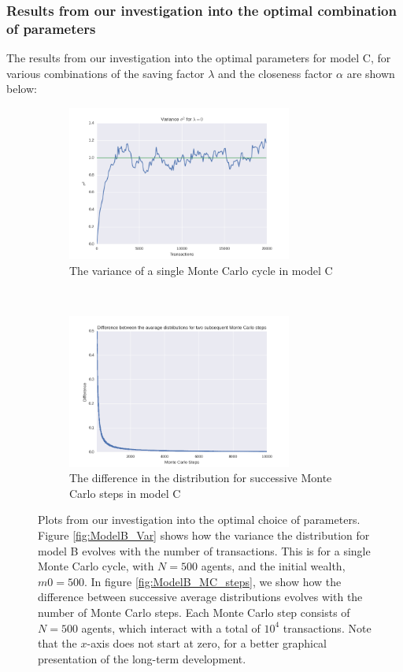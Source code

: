 \documentclass[a4paper, 10pt]{article}
\begin{document}
\subsubsection{Results from our investigation into the optimal combination of parameters}
The results from our investigation into the optimal parameters for model C, for various combinations of the saving factor $\lambda$ and the closeness factor $\alpha$ are shown below:
\begin{figure}[!ht] %
    \centering
    \begin{subfigure}[H!]{0.5\textwidth}
        \centering
        \includegraphics[height=2.0in]{varLamb0.png}
        \caption{The variance of a single Monte Carlo cycle in model C}\label{fig:ModelC_Var}
    \end{subfigure}%
    ~ 
    \begin{subfigure}[H!]{0.5\textwidth}
        \centering
        \includegraphics[height=2.0in]{diffMCLamb0.png}
        \caption{The difference in the distribution for successive Monte Carlo steps in model C}\label{fig:ModelC_MC_steps}
    \end{subfigure}
    \caption{Plots from our investigation into the optimal choice of parameters. Figure \ref{fig:ModelB_Var} shows how the variance the distribution for model B evolves with the number of transactions. This is for a single Monte Carlo cycle, with $N=500$ agents, and the initial wealth, $m0=500$. In figure \ref{fig:ModelB_MC_steps}, we show how the difference between successive average distributions evolves with the number of Monte Carlo steps. Each Monte Carlo step consists of $N=500$ agents, which interact with a total of $10^4$ transactions. Note that the $x$-axis does not start at zero, for a better graphical presentation of the long-term development.}\label{fig:ModelC}
\end{figure} %
\end{document}
